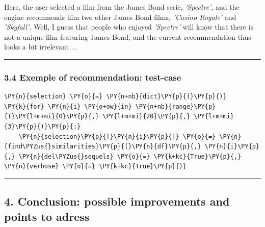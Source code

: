     Here, the user selected a film from the James Bond serie,
\emph{'Spectre'}, and the engine recommends him two other James Bond
films, \emph{'Casino Royale'} and \emph{'Skyfall'}. Well, I guess that
people who enjoyed \emph{'Spectre'} will know that there is not a unique
film featuring James Bond, and the current recommendation thus looks a
bit irrelevant ...

    \begin{center}\rule{0.5\linewidth}{\linethickness}\end{center}

\subsubsection{3.4 Exemple of recommendation:
test-case}\label{exemple-of-recommendation-test-case}

    \begin{tcolorbox}[breakable, size=fbox, boxrule=1pt, pad at break*=1mm,colback=cellbackground, colframe=cellborder]
\begin{Verbatim}[commandchars=\\\{\}]
\PY{n}{selection} \PY{o}{=} \PY{n+nb}{dict}\PY{p}{(}\PY{p}{)}
\PY{k}{for} \PY{n}{i} \PY{o+ow}{in} \PY{n+nb}{range}\PY{p}{(}\PY{l+m+mi}{0}\PY{p}{,} \PY{l+m+mi}{20}\PY{p}{,} \PY{l+m+mi}{3}\PY{p}{)}\PY{p}{:}
    \PY{n}{selection}\PY{p}{[}\PY{n}{i}\PY{p}{]} \PY{o}{=} \PY{n}{find\PYZus{}similarities}\PY{p}{(}\PY{n}{df}\PY{p}{,} \PY{n}{i}\PY{p}{,} \PY{n}{del\PYZus{}sequels} \PY{o}{=} \PY{k+kc}{True}\PY{p}{,} \PY{n}{verbose} \PY{o}{=} \PY{k+kc}{True}\PY{p}{)}
\end{Verbatim}
\end{tcolorbox}

    \begin{center}\rule{0.5\linewidth}{\linethickness}\end{center}

\subsection{4. Conclusion: possible improvements and points to
adress}\label{conclusion-possible-improvements-and-points-to-adress}

